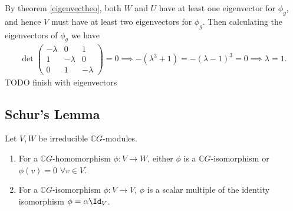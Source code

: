 \documentclass[../Project.tex]{subfiles}
\begin{document}
\begin{exam}
	By theorem \ref{eigenvectheo}, both $W$ and $U$ have at least one eigenvector for $\phi_g$, and hence $V$ must have at least two eigenvectors for $\phi_g$. Then calculating the eigenvectors of $\phi_g$ we have
	\begin{align*}
		\det{\begin{pmatrix}-\lambda & 0 & 1\\1 & -\lambda & 0\\0 & 1 & -\lambda \end{pmatrix}} = 0 \implies
		-(\lambda^3 + 1) = -(\lambda - 1)^3 = 0 \implies \lambda = 1.
	\end{align*}
	TODO finish with eigenvectors

\iffalse
	Then we find there is only one eigenvector corresponding to the single eigenvalue
	$$\begin{pmatrix}0 & 0 & 1\\1 & 0 & 0\\0 & 1 & 0\end{pmatrix}\begin{pmatrix}\alpha_1\\\alpha_2\\\alpha_3\end{pmatrix} = \begin{pmatrix}0\\0\\0\end{pmatrix} \implies \begin{pmatrix}\alpha_1\\\alpha_2\\\alpha_3\end{pmatrix} = \begin{pmatrix}0\\0\\0\end{pmatrix}.$$

	Hence Maschke's theorem does not hold.
	\fi
\end{exam}


\newpage
\subsection{Schur's Lemma}
\begin{lemm}
	Let $V,W$ be irreducible $\mathbb{C}G$-modules.
	\begin{enumerate}
		\item For a $\mathbb{C}G$-homomorphism $\phi : V \to W$, either $\phi$ is a $\mathbb{C}G$-isomorphism or $\phi(v) = 0$ $\forall v \in V$.
		\item For a $\mathbb{C}G$-isomorphism $\phi : V \to V$, $\phi$ is a scalar multiple of the identity isomorphism $\phi = \alpha \Id_V$.
	\end{enumerate}
\end{lemm}
\end{document}
